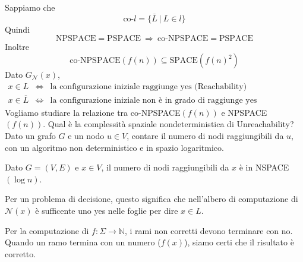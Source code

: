 Sappiamo che 
$$
    \text{co-}l = \{ \overline{L} ~|~ L\in l \}
$$
Quindi 
$$
    \text{NPSPACE}=\text{PSPACE}
    ~\Rightarrow~
    \text{co-NPSPACE}= \text{PSPACE}
$$
Inoltre
$$
    \text{co-NPSPACE}(f(n)) \subseteq \text{SPACE}(f(n)^2)
$$
Dato $G_\mathcal{N}(x)$, 
\begin{eqnarray*}
    x\in L &\Leftrightarrow& \text{la configurazione iniziale raggiunge yes (Reachability)}\\
    x\in \overline{L} &\Leftrightarrow& \text{la configurazione iniziale non è in grado di raggiunge yes (Unreachability)}
\end{eqnarray*}
Vogliamo studiare la relazione tra co-NPSPACE$(f(n))$ e NPSPACE$(f(n))$. Qual è la complessità spa\-zia\-le nondeterministica di Unreachability? Dato un grafo $G$ e un nodo $u\in V$, contare il numero di nodi raggiungibili da $u$, con un algoritmo non deterministico e in spazio logaritmico.

\begin{theorem}
    Dato $G=(V,E)$ e $x\in V$, il numero di nodi raggiungibili da $x$ è in NSPACE$(\log n)$.
\end{theorem}
Per un problema di decisione, questo significa che nell'albero di computazione di $\mathcal{N}(x)$ è sufficente uno yes nelle foglie per dire $x\in L$.

Per la computazione di $f:\Sigma\to\mathbb{N}$, i rami non corretti devono terminare con no. Quando un ramo termina con un numero ($f(x)$), siamo certi che il risultato è corretto.

